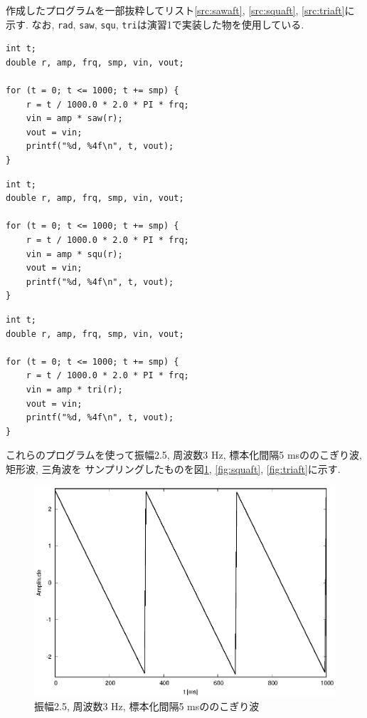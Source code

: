 \documentclass[titlepage]{jsarticle}
\begin{document}
        作成したプログラムを一部抜粋してリスト\ref{src:sawaft}, \ref{src:squaft}, \ref{src:triaft}に示す.
        なお, \verb|rad|, \verb|saw|, \verb|squ|, \verb|tri|は演習1で実装した物を使用している.

        \begin{lstlisting}[caption=sawaft.c, label=src:sawaft]
int t;
double r, amp, frq, smp, vin, vout;

for (t = 0; t <= 1000; t += smp) {
    r = t / 1000.0 * 2.0 * PI * frq;
    vin = amp * saw(r);
    vout = vin;
    printf("%d, %4f\n", t, vout);
}\end{lstlisting}

        \begin{lstlisting}[caption=squaft.c, label=src:squaft]
int t;
double r, amp, frq, smp, vin, vout;

for (t = 0; t <= 1000; t += smp) {
    r = t / 1000.0 * 2.0 * PI * frq;
    vin = amp * squ(r);
    vout = vin;
    printf("%d, %4f\n", t, vout);
}\end{lstlisting}

        \begin{lstlisting}[caption=triaft.c, label=src:triaft]
int t;
double r, amp, frq, smp, vin, vout;

for (t = 0; t <= 1000; t += smp) {
    r = t / 1000.0 * 2.0 * PI * frq;
    vin = amp * tri(r);
    vout = vin;
    printf("%d, %4f\n", t, vout);
}\end{lstlisting}

        これらのプログラムを使って振幅2.5, 周波数3 Hz, 標本化間隔5 msののこぎり波, 矩形波, 三角波を
        サンプリングしたものを図\ref{fig:sawaft}, \ref{fig:squaft}, \ref{fig:triaft}に示す.

        \begin{figure}[h]
            \centering
            \includegraphics[width=0.8\hsize]{images/sawaft.eps}
            \caption{振幅2.5, 周波数3 Hz, 標本化間隔5 msののこぎり波}
            \label{fig:sawaft}
        \end{figure}
\end{document}
